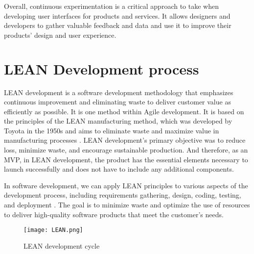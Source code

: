 Overall, continuous experimentation is a critical approach to take when developing user interfaces for products and services. It allows designers and developers to gather valuable feedback and data and use it to improve their products' design and user experience.
\clearpage

\section{LEAN Development process}
\label{background:section:lean}
LEAN development is a software development methodology that emphasizes continuous improvement and eliminating waste to deliver customer value as efficiently as possible. 
It is one method within Agile development.
It is based on the principles of the LEAN manufacturing method, which was developed by Toyota in the 1950s and aims to eliminate waste and maximize value in manufacturing processes \cite{misc:lean:toyota}.
LEAN development's primary objective was to reduce loss, minimize waste, and encourage sustainable production.
And therefore, as an MVP, in LEAN development, the product has the essential elements necessary to launch successfully and does not have to include any additional components.

In software development, we can apply LEAN principles to various aspects of the development process, including requirements gathering, design, coding, testing, and deployment \cite{misc:lean:tutorial}. 
The goal is to minimize waste and optimize the use of resources to deliver high-quality software products that meet the customer's needs.
\begin{figure}[htbp!]
  \centering    
  \texttt{[image: LEAN.png]}
  \caption[LEAN development cycle]{LEAN development cycle\footnotemark[6]}
  \label{fig:background:lean}
\end{figure}

